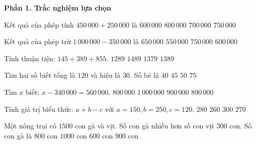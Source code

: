 \textbf{Phần 1. Trắc nghiệm lựa chọn}

\begin{ex} %
Kết quả của phép tính $450\,000 + 250\,000$ là
\choice
{$600\,000$}
{$800\,000$}
{\True $700\,000$}
{$750\,000$}
\end{ex}

\begin{ex} %
Kết quả của phép trừ $1\,000\,000 - 350\,000$ là
\choice
{\True $650\,000$}
{$550\,000$}
{$750\,000$}
{$600\,000$}
\end{ex}

\begin{ex} %
Tính thuận tiện: $145 + 389 + 855$.
\choice
{$1289$}
{$1489$}
{$1379$}
{\True $1389$}
\end{ex}

\begin{ex} %
Tìm hai số biết tổng là $120$ và hiệu là $30$. Số bé là
\choice
{$40$}
{\True $45$}
{$50$}
{$75$}
\end{ex}

\begin{ex} %
Tìm $x$ biết: $x - 340\,000 = 560\,000$.
\choice
{$800\,000$}
{$1\,000\,000$}
{\True $900\,000$}
{$890\,000$}
\end{ex}

\begin{ex} %
Tính giá trị biểu thức: $a + b - c$ với $a = 150, b = 250, c = 120$.
\choice
{\True $280$}
{$260$}
{$300$}
{$270$}
\end{ex}

\begin{ex} %
Một nông trại có $1500$ con gà và vịt. Số con gà nhiều hơn số con vịt $300$ con. Số con gà là
\choice
{$800$ con}
{$1000$ con}
{$600$ con}
{\True $900$ con}
\end{ex}

